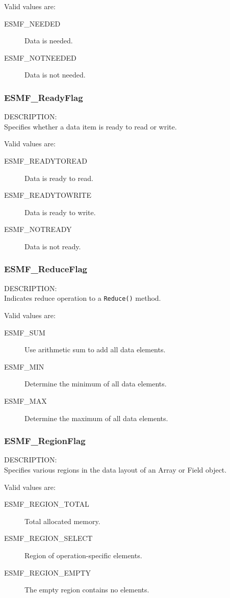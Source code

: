 Valid values are:
\begin{description}
   \item [ESMF\_NEEDED] 
         Data is needed.
   \item [ESMF\_NOTNEEDED]
         Data is not needed.
\end{description}

\subsubsection{ESMF\_ReadyFlag}
\label{opt:readyflag}
{\sf DESCRIPTION:\\}
Specifies whether a data item is ready to read or write.

Valid values are:
\begin{description}
   \item [ESMF\_READYTOREAD] 
         Data is ready to read.
   \item [ESMF\_READYTOWRITE]
         Data is ready to write.
   \item [ESMF\_NOTREADY]
         Data is not ready.
\end{description}

\subsubsection{ESMF\_ReduceFlag}
\label{opt:reduceflag}
{\sf DESCRIPTION:\\}
Indicates reduce operation to a {\tt Reduce()} method.

Valid values are:
\begin{description}
   \item [ESMF\_SUM]
         Use arithmetic sum to add all data elements.
   \item [ESMF\_MIN]
         Determine the minimum of all data elements.
   \item [ESMF\_MAX]
         Determine the maximum of all data elements.
\end{description}

\subsubsection{ESMF\_RegionFlag}
\label{opt:regionflag}
{\sf DESCRIPTION:\\}
Specifies various regions in the data layout of an Array or Field object.

Valid values are:
\begin{description}
\item [ESMF\_REGION\_TOTAL]
      Total allocated memory.
\item [ESMF\_REGION\_SELECT]
      Region of operation-specific elements.
\item [ESMF\_REGION\_EMPTY]
      The empty region contains no elements.
\end{description}

